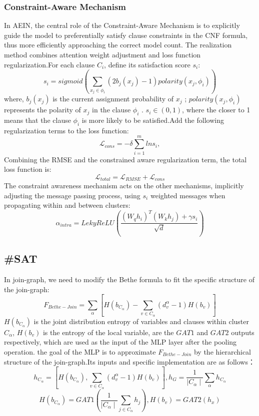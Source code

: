\subsubsection{Constraint-Aware Mechanism}
In AEIN, the central role of the Constraint-Aware Mechanism is to explicitly guide the model to 
preferentially satisfy clause constraints in the CNF formula, thus more efficiently approaching the 
correct model count. The realization method combines attention weight adjustment and loss function 
regularization.For each clause \(C_i\), define its satisfaction score \(s_i\):
\begin{equation}
s_i=sigmoid(\sum_{x_j\in \phi_i}(2b_j(x_j)-1)polarity(x_j,\phi_i))
\end{equation}
where, \(b_j(x_j)\) is  the current assignment probability of \(x_j\) ;  \(polarity(x_j,\phi_i)\) 
represents the polarity of \(x_j\) in the clause \(\phi_i\) .
\(s_i\in (0,1)\), where the closer to 1 means that the clause \(\phi_i\) is more likely to be 
satisfied.Add the following regularization terms to the loss function:
\begin{equation}
\mathcal L_{cons}=-\delta  \sum_{i=1}^mlns_i,
\end{equation}
Combining the RMSE and the constrained aware regularization term, the total loss function is:
\begin{equation}
\mathcal L_{total}=\mathcal L_{RMSE}+\mathcal L_{cons}
\end{equation}
The constraint awareness mechanism acts on the other mechanisms, implicitly adjusting the message 
passing process, using \(s_i\) weighted messages when propagating within and between clusters:
\begin{equation}
\alpha_{intra}=LekyReLU(\frac{(W_qh_i)^T(W_kh_j)+\gamma s_i}{\sqrt{d}})
\end{equation}
\subsection{\#SAT}
In join-graph, we need to modify the Bethe formula to fit the specific structure of the join-graph:
\begin{equation}
   F_{Bethe-Join}=\sum_\alpha [H(b_{C_\alpha})-\sum_{v\in C_\alpha}(d_v^\alpha-1)H(b_v)]
\end{equation}
\(H(b_{C_\alpha})\) is the joint distribution entropy of variables and clauses within cluster \(C_\alpha\), 
\(H(b_v)\) is the entropy of the local variable, are the \(GAT1\) and \(GAT2\) outputs respectively, 
which are used as the input of the MLP layer after the pooling operation. the goal of the MLP is to 
approximate \(F_{Bethe-Join}\) by  the hierarchical structure of the join-graph.Its inputs and specific 
implementation are as follows：
\begin{equation}
    h_{C_\alpha}=[H(b_{C_\alpha}), \sum_{v\in C_\alpha}(d_v^\alpha-1)H(b_v)], h_G=\frac{1}
    {\mid{C_\alpha}\mid}\sum_\alpha h_{C_\alpha}
\end{equation}
\begin{equation}
   H(b_{C_\alpha})=GAT1(\frac{1}{ \mid C_\alpha\mid}\sum_{j\in C_\alpha}h_j), H(b_v)=GAT2(h_x)
\end{equation}

